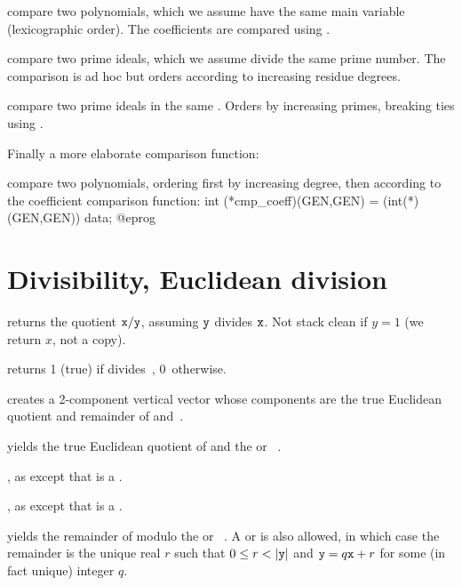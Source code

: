  compare two polynomials, which we assume
have the same main variable (lexicographic order). The coefficients are
compared using .

 compare two prime ideals, which
we assume divide the same prime number. The comparison is ad hoc but orders
according to increasing residue degrees.

 compare two prime ideals in the same
. Orders by increasing primes, breaking ties using
.

Finally a more elaborate comparison function:

 compare two polynomials,
ordering first by increasing degree, then according to the coefficient
comparison function:
\bprog
  int (*cmp_coeff)(GEN,GEN) = (int(*)(GEN,GEN)) data;
@eprog

\section{Divisibility, Euclidean division}

 returns the quotient ${\tt x} / {\tt y}$,
assuming ${\tt y}$ divides ${\tt x}$. Not stack clean if $y = 1$
(we return $x$, not a copy).

  returns 1 (true) if  divides~,
0~otherwise.

 creates a 2-component vertical
vector whose components are the true Euclidean quotient and remainder
of  and~.

 yields the true Euclidean
quotient of  and the  or ~.

, as 
except that  is a .

, as 
except that  is a .

 yields the remainder of 
modulo the  or ~. A  or  
is also allowed, in which case the remainder is the unique real $r$ such that
$0 \leq r < |{\tt y}|$ and ${\tt y} = q{\tt x} + r$ for some (in fact unique)
integer $q$.

